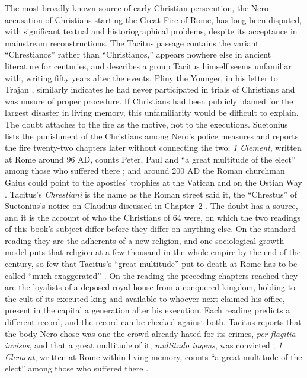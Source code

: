 The most broadly known source of early Christian persecution, the Nero accusation of Christians starting the Great Fire of Rome, has long been disputed, with significant textual and historiographical problems, despite its acceptance in mainstream reconstructions.
The Tacitus passage \cite[15.44]{tacitus:annals} contains the variant ``Chrestianos'' rather than ``Christianos,'' appears nowhere else in ancient literature for centuries, and describes a group Tacitus himself seems unfamiliar with, writing fifty years after the events.
Pliny the Younger, in his letter to Trajan \cite[10.96]{pliny:letters}, similarly indicates he had never participated in trials of Christians and was unsure of proper procedure.
If Christians had been publicly blamed for the largest disaster in living memory, this unfamiliarity would be difficult to explain.
The doubt attaches to the fire as the motive, not to the executions.
Suetonius lists the punishment of the Christians among Nero's police measures \cite[Nero 16]{suetonius:caesars} and reports the fire twenty-two chapters later \cite[Nero 38]{suetonius:caesars} without connecting the two; \emph{1 Clement}, written at Rome around 96 AD, counts Peter, Paul and ``a great multitude of the elect'' among those who suffered there \cite[5--6]{clement:firstclement}; and around 200 AD the Roman churchman Gaius could point to the apostles' trophies at the Vatican and on the Ostian Way \cite[2.25.7]{eusebius:he}.
Tacitus's \emph{Chrestiani} is the name as the Roman street said it, the ``Chrestus'' of Suetonius's notice on Claudius discussed in Chapter~2 \cite[25.4]{suetonius:claudius}.
The doubt has a source, and it is the account of who the Christians of 64 were, on which the two readings of this book's subject differ before they differ on anything else.
On the standard reading they are the adherents of a new religion, and one sociological growth model puts that religion at a few thousand in the whole empire by the end of the century, so few that Tacitus's ``great multitude'' put to death at Rome has to be called ``much exaggerated'' \cite[3, 5]{stark:rise}.
On the reading the preceding chapters reached they are the loyalists of a deposed royal house from a conquered kingdom, holding to the cult of its executed king and available to whoever next claimed his office, present in the capital a generation after his execution.
Each reading predicts a different record, and the record can be checked against both.
Tacitus reports that the body Nero chose was one the crowd already hated for its crimes, \emph{per flagitia invisos}, and that a great multitude of it, \emph{multitudo ingens}, was convicted \cite[15.44]{tacitus:annals}; \emph{1 Clement}, written at Rome within living memory, counts ``a great multitude of the elect'' among those who suffered there \cite[6]{clement:firstclement}.
